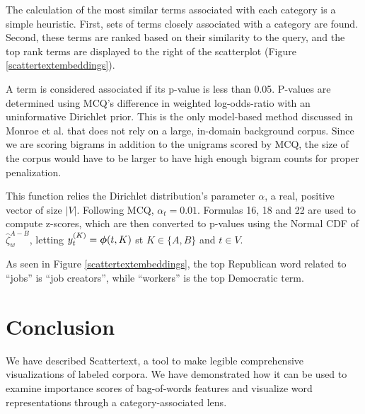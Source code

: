 \documentclass[11pt,a4paper]{article}
\begin{document}
The calculation of the most similar terms associated with each category is a simple heuristic.  First, sets of terms closely associated with a category are found. Second, these terms are ranked based on their similarity to the query, and the top rank terms are displayed to the right of the scatterplot (Figure \ref{scattertextembeddings}).  

A term is considered associated if its p-value is less than 0.05.  P-values are determined using MCQ's difference in weighted log-odds-ratio with an uninformative Dirichlet prior.  This is the only model-based method discussed in Monroe et al. that does not rely on a large, in-domain background corpus. Since we are scoring bigrams in addition to the unigrams scored by MCQ, the size of the corpus would have to be larger to have high enough bigram counts for proper penalization.

This function relies the Dirichlet distribution's parameter $\alpha$, a real, positive vector of size $|V|$. Following MCQ, $\alpha_t = 0.01$.  Formulas 16, 18 and 22 are used to compute z-scores, which are then converted to p-values using the Normal CDF of $\hat{\zeta}_{w}^{A-B}$, letting $y^{(K)}_{t} = \mbox{\boldmath$\phi$}(t,K)$ st ${K}\in{\{A,B\}}$ and $t\in{V}$.

As seen in Figure \ref{scattertextembeddings}, the top Republican word related to ``jobs'' is ``job creators'', while ``workers'' is the top Democratic term.
\section{Conclusion}
We have described Scattertext, a tool to make legible comprehensive visualizations of labeled corpora.  We have demonstrated how it can be used to examine importance scores of bag-of-words features and visualize word representations through a category-associated lens. 
\vspace{-.5cm}


\end{document}
